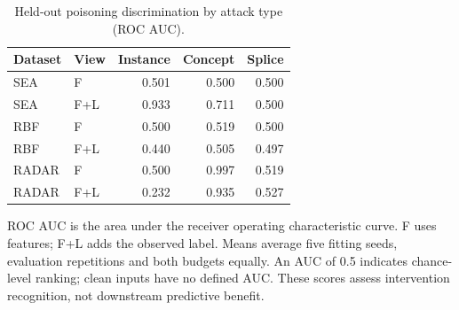 \begin{table}[htbp]
\centering\small\singlespacing
\caption{Held-out poisoning discrimination by attack type (ROC AUC).}\label{tab:filter_discrimination}
\setlength{\tabcolsep}{4pt}
\renewcommand{\arraystretch}{1.15}
\begin{tabular}{@{}llrrr@{}}
\toprule
Dataset & View & Instance & Concept & Splice \\
\midrule
SEA & F & 0.501 & 0.500 & 0.500 \\
SEA & F+L & 0.933 & 0.711 & 0.500 \\
RBF & F & 0.500 & 0.519 & 0.500 \\
RBF & F+L & 0.440 & 0.505 & 0.497 \\
RADAR & F & 0.500 & 0.997 & 0.519 \\
RADAR & F+L & 0.232 & 0.935 & 0.527 \\
\bottomrule
\end{tabular}
\par\smallskip\begin{minipage}{\textwidth}\footnotesize ROC AUC is the area under the receiver operating characteristic curve. F uses features; F+L adds the observed label. Means average five fitting seeds, evaluation repetitions and both budgets equally. An AUC of 0.5 indicates chance-level ranking; clean inputs have no defined AUC. These scores assess intervention recognition, not downstream predictive benefit.\end{minipage}
\end{table}
